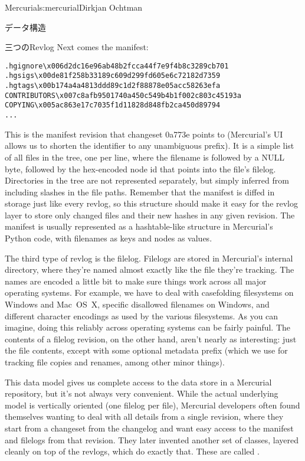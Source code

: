 \begin{aosachapter}{Mercurial}{s:mercurial}{Dirkjan Ochtman}
\begin{aosasect1}{データ構造}
\begin{aosasect2}{三つのRevlog}
Next comes the manifest:

\begin{verbatim}
.hgignore\x006d2dc16e96ab48b2fcca44f7e9f4b8c3289cb701
.hgsigs\x00de81f258b33189c609d299fd605e6c72182d7359
.hgtags\x00b174a4a4813ddd89c1d2f88878e05acc58263efa
CONTRIBUTORS\x007c8afb9501740a450c549b4b1f002c803c45193a
COPYING\x005ac863e17c7035f1d11828d848fb2ca450d89794
...
\end{verbatim}

\noindent This is the manifest revision that changeset 0a773e points to
(Mercurial's UI allows us to shorten the identifier to any unambiguous
prefix). It is a simple list of all files in the tree, one per line,
where the filename is followed by a NULL byte, followed by the
hex-encoded node id that points into the file's filelog. Directories
in the tree are not represented separately, but simply inferred from
including slashes in the file paths. Remember that the manifest is
diffed in storage just like every revlog, so this structure should
make it easy for the revlog layer to store only changed files and
their new hashes in any given revision. The manifest is usually
represented as a hashtable-like structure in Mercurial's Python code,
with filenames as keys and nodes as values.

The third type of revlog is the filelog. Filelogs are stored in Mercurial's internal  directory,
where they're named almost exactly like the file they're tracking. The
names are encoded a little bit to make sure things work across all
major operating systems. For example, we have to deal with casefolding
filesystems on Windows and Mac~OS~X, specific disallowed filenames on
Windows, and different character encodings as used by the various
filesystems. As you can imagine, doing this reliably across operating
systems can be fairly painful. The contents of a filelog revision, on
the other hand, aren't nearly as interesting: just the file contents,
except with some optional metadata prefix (which we use for tracking
file copies and renames, among other minor things).

This data model gives us complete access to the data store in a
Mercurial repository, but it's not always very convenient. While the
actual underlying model is vertically oriented (one filelog per file),
Mercurial developers often found themselves wanting to deal with all
details from a single revision, where they start from a changeset from
the changelog and want easy access to the manifest and filelogs from
that revision.  They later invented another set of classes, layered
cleanly on top of the revlogs, which do exactly that. These are
called .


\end{aosasect2}
\end{aosasect1}
\end{aosachapter}
